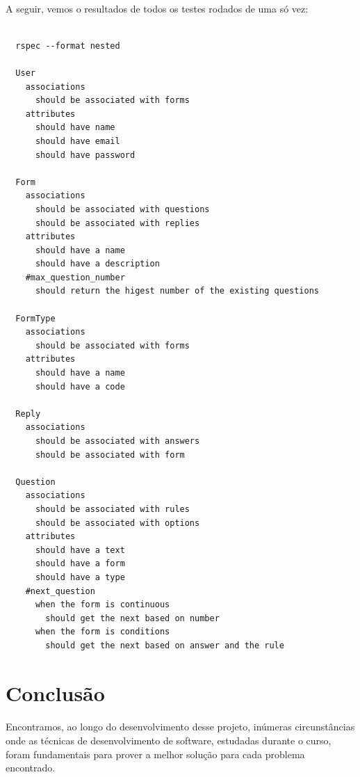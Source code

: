 \documentclass[11pt]{article}
\begin{document}
    \paragraph{}
    
    A seguir, vemos o resultados de todos os testes rodados de uma
    só vez:
    
    {\scriptsize
      \lstset{language=Bash}
      \begin{lstlisting}

  rspec --format nested 
  
  User
    associations
      should be associated with forms
    attributes
      should have name
      should have email
      should have password

  Form
    associations
      should be associated with questions
      should be associated with replies
    attributes
      should have a name
      should have a description
    #max_question_number
      should return the higest number of the existing questions

  FormType
    associations
      should be associated with forms
    attributes
      should have a name
      should have a code

  Reply
    associations
      should be associated with answers
      should be associated with form
    
  Question
    associations
      should be associated with rules
      should be associated with options
    attributes
      should have a text
      should have a form
      should have a type
    #next_question
      when the form is continuous
        should get the next based on number
      when the form is conditions
        should get the next based on answer and the rule
      \end{lstlisting}
    }
    
    
  \clearpage
      
  \section{Conclusão}

    \paragraph{}
    Encontramos, ao longo do desenvolvimento desse projeto, inúmeras 
    circunstâncias onde as técnicas de desenvolvimento de software, 
    estudadas durante o curso, foram fundamentais para prover a melhor 
    solução para cada problema encontrado.
    
\end{document}
